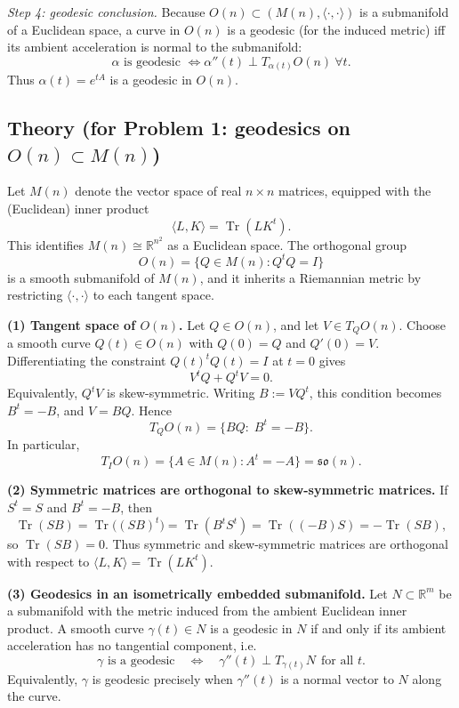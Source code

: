\documentclass[12pt,a4paper]{article}
\DeclareMathOperator{\Tr}{Tr}
\theoremstyle{plain}
\theoremstyle{definition}      %
\begin{document}
\medskip
\emph{Step 4: geodesic conclusion.}
Because \(O(n)\subset (M(n),\langle\cdot,\cdot\rangle)\) is a submanifold of a Euclidean space, a curve in \(O(n)\) is a geodesic (for the induced metric) iff its ambient acceleration is normal to the submanifold:
\[
\alpha \text{ is geodesic }\iff \alpha''(t)\perp T_{\alpha(t)}O(n)\ \forall t.
\]
Thus \(\alpha(t)=e^{tA}\) is a geodesic in \(O(n)\).



\subsection*{Theory (for Problem 1: geodesics on \(O(n)\subset M(n)\))}

Let \(M(n)\) denote the vector space of real \(n\times n\) matrices, equipped with the
(Euclidean) inner product
\[
\langle L,K\rangle=\Tr(LK^{t}).
\]
This identifies \(M(n)\cong\mathbb{R}^{n^{2}}\) as a Euclidean space. The orthogonal group
\[
O(n)=\{Q\in M(n): Q^{t}Q=I\}
\]
is a smooth submanifold of \(M(n)\), and it inherits a Riemannian metric by restricting
\(\langle\cdot,\cdot\rangle\) to each tangent space.

\medskip
\noindent\textbf{(1) Tangent space of \(O(n)\).}
Let \(Q\in O(n)\), and let \(V\in T_{Q}O(n)\). Choose a smooth curve \(Q(t)\in O(n)\) with
\(Q(0)=Q\) and \(Q'(0)=V\). Differentiating the constraint \(Q(t)^{t}Q(t)=I\) at \(t=0\) gives
\[
V^{t}Q+Q^{t}V=0.
\]
Equivalently, \(Q^{t}V\) is skew-symmetric. Writing \(B:=VQ^{t}\), this condition becomes
\(B^{t}=-B\), and \(V=BQ\). Hence
\[
T_{Q}O(n)=\{BQ:\; B^{t}=-B\}.
\]
In particular,
\[
T_{I}O(n)=\{A\in M(n): A^{t}=-A\}=\mathfrak{so}(n).
\]

\medskip
\noindent\textbf{(2) Symmetric matrices are orthogonal to skew-symmetric matrices.}
If \(S^{t}=S\) and \(B^{t}=-B\), then
\[
\Tr(SB)=\Tr\bigl((SB)^{t}\bigr)=\Tr(B^{t}S^{t})=\Tr((-B)S)=-\Tr(SB),
\]
so \(\Tr(SB)=0\). Thus symmetric and skew-symmetric matrices are orthogonal with respect to
\(\langle L,K\rangle=\Tr(LK^{t})\).

\medskip
\noindent\textbf{(3) Geodesics in an isometrically embedded submanifold.}
Let \(N\subset \mathbb{R}^{m}\) be a submanifold with the metric induced from the ambient
Euclidean inner product. A smooth curve \(\gamma(t)\in N\) is a geodesic in \(N\) if and only if
its ambient acceleration has no tangential component, i.e.
\[
\gamma \text{ is a geodesic}\quad \Longleftrightarrow\quad
\gamma''(t)\perp T_{\gamma(t)}N\ \ \text{for all }t.
\]
Equivalently, \(\gamma\) is geodesic precisely when \(\gamma''(t)\) is a normal vector to \(N\)
along the curve.
\end{document}
